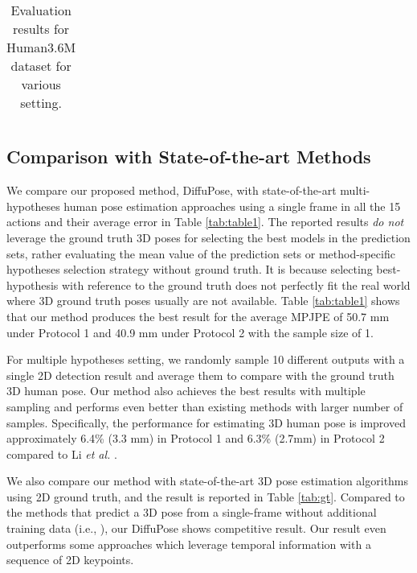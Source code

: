 \documentclass[letterpaper, 10 pt, conference]{ieeeconf}
\begin{document}
\begin{table}[t]
{\begin{tabular}{c|c|c}
    \bottomrule
    \end{tabular}
    }
    \caption{Evaluation results for Human3.6M dataset for various setting.}
    \label{tab:table4}
    \vspace{-20pt}
\end{table} 
\subsection{Comparison with State-of-the-art Methods}
We compare our proposed method, DiffuPose, with state-of-the-art multi-hypotheses human pose estimation approaches using a single frame in all the 15 actions and their average error in Table \ref{tab:table1}.
The reported results \textit{do not} leverage the ground truth 3D poses for selecting the best models in the prediction sets, rather evaluating the mean value of the prediction sets or method-specific hypotheses selection strategy without ground truth.
It is because selecting best-hypothesis with reference to the ground truth does not perfectly fit the real world where 3D ground truth poses usually are not available.
Table \ref{tab:table1} shows that our method produces the best result for the average MPJPE of 50.7 mm under Protocol 1  and 40.9 mm under Protocol 2 with the sample size of 1.

For multiple hypotheses setting, we randomly sample 10 different outputs with a single 2D detection result and average them to compare with the ground truth 3D human pose.
Our method also achieves the best results with multiple sampling and performs even better than existing methods with larger number of samples.
Specifically, the performance for estimating 3D human pose is improved approximately 6.4\% (3.3 mm) in Protocol 1 and 6.3\% (2.7mm) in Protocol 2 compared to Li \textit{et al.} \cite{li2019generating}.

We also compare our method with state-of-the-art 3D pose estimation algorithms using 2D ground truth, and the result is reported in Table \ref{tab:gt}.
Compared to the methods that predict a 3D pose from a single-frame without additional training data (i.e., \cite{martinez2017simple, zhao2019semantic, liu2020comprehensive, xu2021graph}), our DiffuPose shows competitive result. 
Our result even outperforms some approaches which leverage temporal information with a sequence of 2D keypoints.
\end{document}
